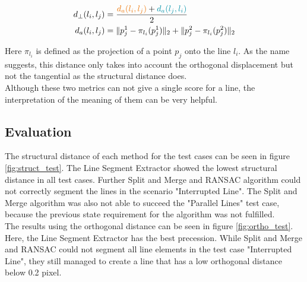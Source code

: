 \documentclass{scp}
\begin{document}
\begin{align}
    d_{\perp} (l_i, l_j) &= \frac{ \color{uzllightorange} {d_a(l_i, l_j)}  \color{black}+ \color{uzlblue} d_a(l_j, l_i) \color{black}}{2} \label{eq:ortho}\\
    d_a(l_i, l_j) &= \|p_j^1 - \pi_{l_i}(p_j^1)\|_2 + \|p_j^2 - \pi_{l_i}(p_j^2)\|_2
\end{align}

Here $\pi_{l_i}$ is defined as the projection of a point $p_j$ onto the line $l_i$. As the name suggests, this distance only takes into account the orthogonal displacement but not the tangential as the structural distance does.\\
Although these two metrics can not give a single score for a line, the interpretation of the meaning of them can be very helpful.

%

\subsection*{Evaluation}


The structural distance of each method for the test cases can be seen in figure \ref{fig:struct_test}. The Line Segment Extractor showed the lowest structural distance in all test cases. Further Split and Merge and RANSAC algorithm could not correctly segment the lines in the scenario "Interrupted Line". The Split and Merge algorithm was also not able to succeed the "Parallel Lines" test case, because the previous state requirement for the algorithm was not fulfilled.\\
The results using the orthogonal distance can be seen in figure \ref{fig:ortho_test}. Here, the Line Segment Extractor has the best precession. While Split and Merge and RANSAC could not segment all line elements in the test case "Interrupted Line", they still managed to create a line that has a low orthogonal distance below 0.2 pixel. 

\end{document}
